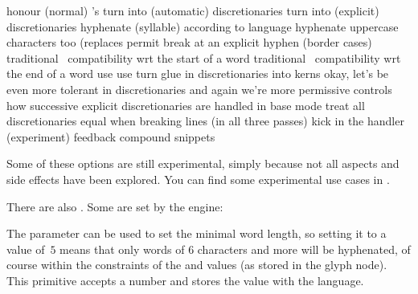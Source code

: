 \starttabulate[|rT|p|]
\NC \tohexadecimal \normalhyphenationcode            \NC honour (normal) \type{\discretionary}'s \NC \NR
\NC \tohexadecimal \automatichyphenationcode         \NC turn \type {-} into (automatic) discretionaries \NC \NR
\NC \tohexadecimal \explicithyphenationcode          \NC turn \type {\-} into (explicit) discretionaries \NC \NR
\NC \tohexadecimal \syllablehyphenationcode          \NC hyphenate (syllable) according to language \NC \NR
\NC \tohexadecimal \uppercasehyphenationcode         \NC hyphenate uppercase characters too (replaces \type {\uchyph} \NC \NR
\NC \tohexadecimal \compoundhyphenationcode          \NC permit break at an explicit hyphen (border cases) \NC \NR
\NC \tohexadecimal \strictstarthyphenationcode       \NC traditional \TEX\ compatibility wrt the start of a word \NC \NR
\NC \tohexadecimal \strictendhyphenationcode         \NC traditional \TEX\ compatibility wrt the end of a word \NC \NR
\NC \tohexadecimal \automaticpenaltyhyphenationcode  \NC use \type {\automatichyphenpenalty} \NC \NR
\NC \tohexadecimal \explicitpenaltyhyphenationcode   \NC use \type {\explicithyphenpenalty} \NC \NR
\NC \tohexadecimal \permitgluehyphenationcode        \NC turn glue in discretionaries into kerns \NC \NR
\NC \tohexadecimal \permitallhyphenationcode         \NC okay, let's be even more tolerant in discretionaries \NC \NR
\NC \tohexadecimal \permitmathreplacehyphenationcode \NC and again we're more permissive \NC \NR
\NC \tohexadecimal \lazyligatureshyphenationcode     \NC controls how successive explicit discretionaries are handled in base mode \NC \NR
\NC \tohexadecimal \forcecheckhyphenationcode        \NC treat all discretionaries equal when breaking lines (in all three passes) \NC \NR
\NC \tohexadecimal \forcehandlerhyphenationcode      \NC kick in the handler (experiment) \NC \NR
\NC \tohexadecimal \feedbackcompoundhyphenationcode  \NC feedback compound snippets \NC \NR
\stoptabulate

Some of these options are still experimental, simply because not all aspects and
side effects have been explored. You can find some experimental use cases in
\CONTEXT.

There are also \type {\discretionaryoptions}. Some are set by the engine:

\startcolumns
{}
\stopcolumns

\stopsection

\startsection[title={Controlling hyphenation}]

The \typ {\hyphenationmin} parameter can be used to set the minimal word length,
so setting it to a value of~$5$ means that only words of 6 characters and more
will be hyphenated, of course within the constraints of the \typ {\lefthyphenmin}
and \typ {\righthyphenmin} values (as stored in the glyph node). This primitive
accepts a number and stores the value with the language.

